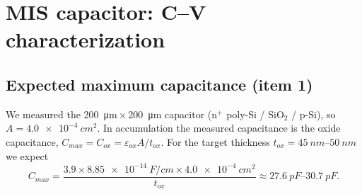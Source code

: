 \section{MIS capacitor: C--V characterization}\label{sec:mis}

\subsection{Expected maximum capacitance (item 1)}\label{sec:mis-cmax}
We measured the \SI{200}{\micro m}\,$\times$\,\SI{200}{\micro m} capacitor
(n$^+$ poly-Si / SiO$_2$ / p-Si), so $A=\SI{4.0e-4}{cm^2}$. In accumulation the measured
capacitance is the oxide capacitance, $C_{max}=C_{ox}=\varepsilon_{ox}A/t_{ox}$. For the target
thickness $t_{ox}=\SIrange{45}{50}{nm}$ we expect
\[
C_{max}=\frac{3.9\times\SI{8.85e-14}{F/cm}\times\SI{4.0e-4}{cm^2}}{t_{ox}}
\approx\SIrange{27.6}{30.7}{pF}.
\]

